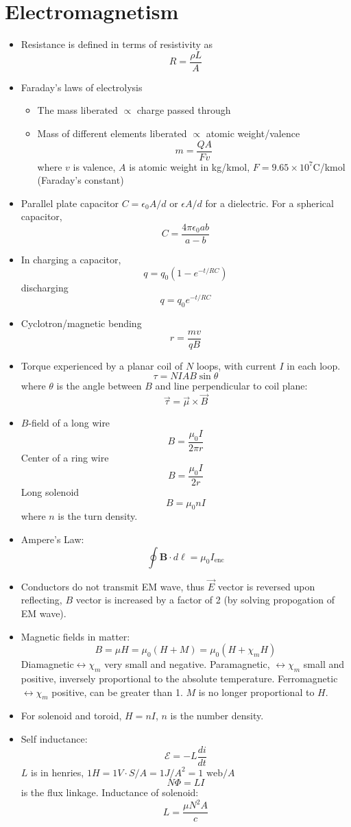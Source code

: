 \documentclass[english]{article}
\begin{document}
\section{Electromagnetism}
\begin{itemize}
\item Resistance is defined in terms of resistivity as\[
R=\frac{\rho L}{A}\]

\item Faraday's laws of electrolysis

\begin{itemize}
\item The mass liberated $\propto$ charge passed through
\item Mass of different elements liberated $\propto$ atomic weight/valence\[
m=\frac{QA}{Fv}\]
where $v$ is valence, $A$ is atomic weight in kg/kmol, $F=9.65\times10^{7}$C/kmol
(Faraday's constant)
\end{itemize}
\item Parallel plate capacitor $C=\epsilon_{0}A/d$ or $\epsilon A/d$ for
a dielectric. For a spherical capacitor,\[
C=\frac{4\pi\epsilon_{0}ab}{a-b}\]

\item In charging a capacitor,\[
q=q_{0}(1-e^{-t/RC})\]
discharging\[
q=q_{0}e^{-t/RC}\]

\item Cyclotron/magnetic bending\[
r=\frac{mv}{qB}\]

\item Torque experienced by a planar coil of $N$ loops, with current $I$
in each loop.\[
\tau=NIAB\sin\theta\]
where $\theta$ is the angle between $B$ and line perpendicular to
coil plane:\[
\vec{\tau}=\vec{\mu}\times\vec{B}\]

\item $B$-field of a long wire\[
B=\frac{\mu_{0}I}{2\pi r}\]
Center of a ring wire\[
B=\frac{\mu_{0}I}{2r}\]
Long solenoid\[
B=\mu_{0}nI\]
where $n$ is the turn density.
\item Ampere's Law:\[
\oint\mathbf{B}\cdot d\boldsymbol{\ell}=\mu_{0}I_{\text{enc}}\]

\item Conductors do not transmit EM wave, thus $\vec{E}$ vector is reversed
upon reflecting, $B$ vector is increased by a factor of 2 (by solving
propogation of EM wave).
\item Magnetic fields in matter:\[
B=\mu H=\mu_{0}(H+M)=\mu_{0}(H+\chi_{m}H)\]
Diamagnetic$\leftrightarrow\chi_{m}$ very small and negative. Paramagnetic,
$\leftrightarrow\chi_{m}$ small and positive, inversely proportional
to the absolute temperature. Ferromagnetic $\leftrightarrow\chi_{m}$
positive, can be greater than 1. $M$ is no longer proportional to
$H$.
\item For solenoid and toroid, $H=nI$, $n$ is the number density.
\item Self inductance:\[
\mathcal{E}=-L\frac{di}{dt}\]
$L$ is in henries, $1H=1V\cdot S/A=1J/A^{2}=1\text{ web}/A$\[
N\Phi=LI\]
is the flux linkage. Inductance of solenoid:\[
L=\frac{\mu N^{2}A}{c}\]


\end{itemize}
\end{document}
